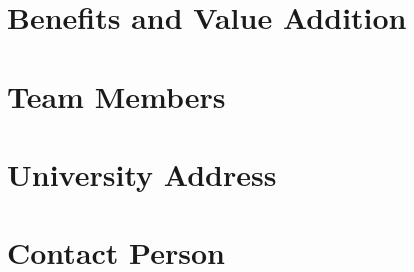 \documentclass[12pt]{article}
\begin{document}
\section{Benefits and Value Addition}

\section{Team Members}

\section{University Address}

\section{Contact Person}



\end{document}
